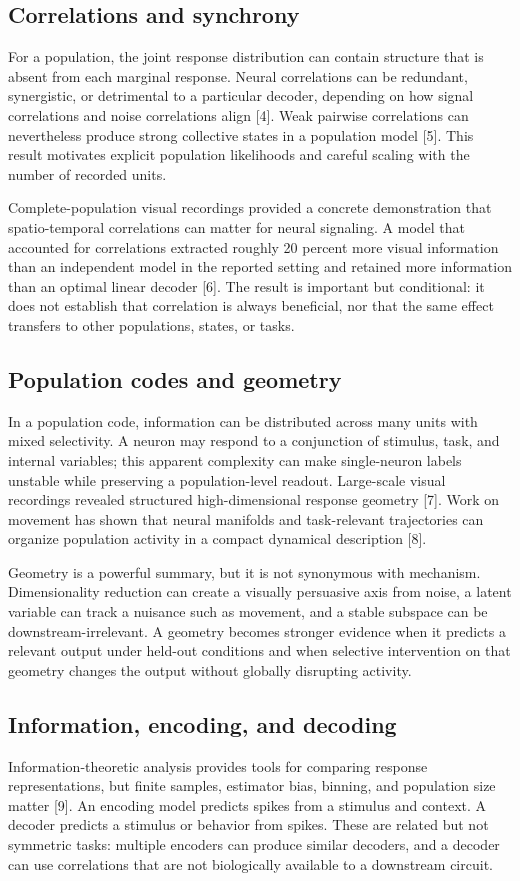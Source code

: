 \documentclass[conference]{IEEEtran}
\begin{document}
\subsection{Correlations and synchrony}
For a population, the joint response distribution can contain structure that is absent from each marginal response. Neural correlations can be redundant, synergistic, or detrimental to a particular decoder, depending on how signal correlations and noise correlations align [4]. Weak pairwise correlations can nevertheless produce strong collective states in a population model [5]. This result motivates explicit population likelihoods and careful scaling with the number of recorded units.

Complete-population visual recordings provided a concrete demonstration that spatio-temporal correlations can matter for neural signaling. A model that accounted for correlations extracted roughly 20 percent more visual information than an independent model in the reported setting and retained more information than an optimal linear decoder [6]. The result is important but conditional: it does not establish that correlation is always beneficial, nor that the same effect transfers to other populations, states, or tasks.

\subsection{Population codes and geometry}
In a population code, information can be distributed across many units with mixed selectivity. A neuron may respond to a conjunction of stimulus, task, and internal variables; this apparent complexity can make single-neuron labels unstable while preserving a population-level readout. Large-scale visual recordings revealed structured high-dimensional response geometry [7]. Work on movement has shown that neural manifolds and task-relevant trajectories can organize population activity in a compact dynamical description [8].

Geometry is a powerful summary, but it is not synonymous with mechanism. Dimensionality reduction can create a visually persuasive axis from noise, a latent variable can track a nuisance such as movement, and a stable subspace can be downstream-irrelevant. A geometry becomes stronger evidence when it predicts a relevant output under held-out conditions and when selective intervention on that geometry changes the output without globally disrupting activity.

\subsection{Information, encoding, and decoding}
Information-theoretic analysis provides tools for comparing response representations, but finite samples, estimator bias, binning, and population size matter [9]. An encoding model predicts spikes from a stimulus and context. A decoder predicts a stimulus or behavior from spikes. These are related but not symmetric tasks: multiple encoders can produce similar decoders, and a decoder can use correlations that are not biologically available to a downstream circuit.
\end{document}
